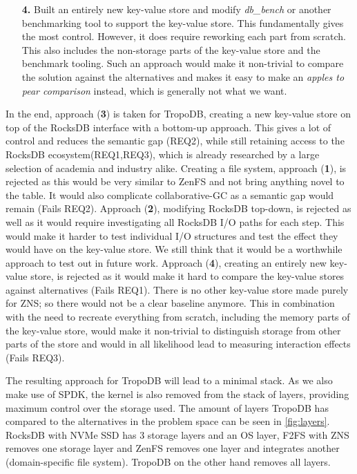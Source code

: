 \begin{enumerate}
    \item[\textbf{4.}] Built an entirely new key-value store and modify \textit{db\_bench} or another benchmarking tool to support the key-value store. This fundamentally gives the most control. However, it does require reworking each part from scratch. This also includes the non-storage parts of the key-value store and the benchmark tooling. Such an approach would make it non-trivial to compare the solution against the alternatives and makes it easy to make an \textit{apples to pear comparison} instead, which is generally not what we want.
\end{enumerate}
In the end, approach (\textbf{3}) is taken for TropoDB, creating a new key-value store on top of the RocksDB interface with a bottom-up approach. This gives a lot of control and reduces the semantic gap (REQ2), while still retaining access to the RocksDB ecosystem(REQ1,REQ3), which is already researched by a large selection of academia and industry alike. Creating a file system, approach (\textbf{1}), is rejected as this would be very similar to ZenFS and not bring anything novel to the table. It would also complicate collaborative-GC as a semantic gap would remain (Fails REQ2). Approach (\textbf{2}), modifying RocksDB top-down, is rejected as well as it would require investigating all RocksDB I/O paths for each step. This would make it harder to test individual I/O structures and test the effect they would have on the key-value store. We still think that it would be a worthwhile approach to test out in future work. Approach (\textbf{4}), creating an entirely new key-value store, is rejected as it would make it hard to compare the key-value stores against alternatives (Fails REQ1). There is no other key-value store made purely for ZNS; so there would not be a clear baseline anymore. This in combination with the need to recreate everything from scratch, including the memory parts of the key-value store, would make it non-trivial to distinguish storage from other parts of the store and would in all likelihood lead to measuring interaction effects (Fails REQ3).  

The resulting approach for TropoDB will lead to a minimal stack. As we also make use of SPDK, the kernel is also removed from the stack of layers, providing maximum control over the storage used. The amount of layers TropoDB has compared to the alternatives in the problem space can be seen in \autoref{fig:layers}. RocksDB with NVMe SSD has 3 storage layers and an OS layer, F2FS with ZNS removes one storage layer and ZenFS removes one layer and integrates another (domain-specific file system). TropoDB on the other hand removes all layers.

